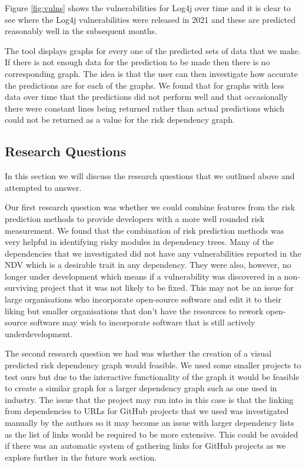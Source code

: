 \documentclass[conference]{IEEEtran}
\begin{document}
Figure \ref{fig:vulns} shows the vulnerabilities for Log4j over time and it is clear to see where the Log4j vulnerabilities were released in 2021 and these are predicted reasonably well in the subsequent months. 

The tool displays graphs for every one of the predicted sets of data that we make. If there is not enough data for the prediction to be made then there is no corresponding graph. The idea is that the user can then investigate how accurate the predictions are for each of the graphs. We found that for graphs with less data over time that the predictions did not perform well and that occasionally there were constant lines being returned rather than actual predictions which could not be returned as a value for the risk dependency graph. 

\subsection{Research Questions}
In this section we will discuss the research questions that we outlined above and attempted to answer. 

Our first research question was whether we could combine features from the risk prediction methods to provide developers with a more well rounded risk measurement. We found that the combination of risk prediction methods was very helpful in identifying risky modules in dependency trees. Many of the dependencies that we investigated did not have any vulnerabilities reported in the NDV which is a desirable trait in any dependency. They were also, however, no longer under development which means if a vulnerability was discovered in a non-surviving project that it was not likely to be fixed. This may not be an issue for large organisations who incorporate open-source software and edit it to their liking but smaller organisations that don't have the resources to rework open-source software may wish to incorporate software that is still actively underdevelopment.

The second research question we had was whether the creation of a visual predicted risk dependency graph would feasible. We used some smaller projects to test ours but due to the interactive functionality of the graph it would be feasible to create a similar graph for a larger dependency graph such as one used in industry. The issue that the project may run into in this case is that the linking from dependencies to URLs for GitHub projects that we used was investigated manually by the authors so it may become an issue with larger dependency lists as the list of links would be required to be more extensive. This could be avoided if there was an automatic system of gathering links for GitHub projects as we explore further in the future work section. 
\end{document}
